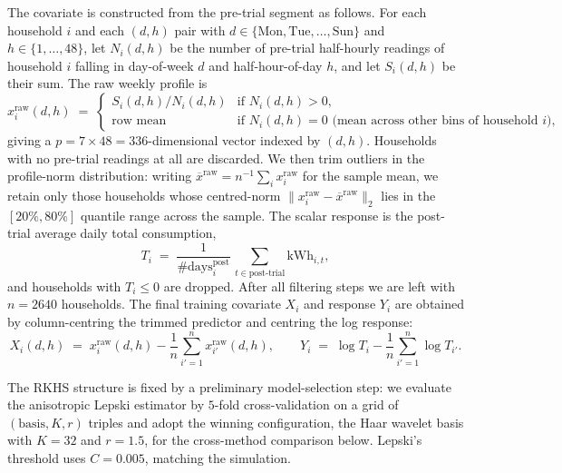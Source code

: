 \documentclass[aos]{imsart}
\renewcommand{\bar}{\overline}
\theoremstyle{plain}
\theoremstyle{definition}
\theoremstyle{definition}
\begin{document}
The covariate is constructed from the pre-trial segment as follows. For each household $i$ and each $(d, h)$ pair with $d \in \{\text{Mon},\text{Tue},\ldots,\text{Sun}\}$ and $h \in \{1,\ldots,48\}$, let $N_i(d,h)$ be the number of pre-trial half-hourly readings of household $i$ falling in day-of-week $d$ and half-hour-of-day $h$, and let $S_i(d,h)$ be their sum. The raw weekly profile is
\[
x_i^{\text{raw}}(d, h) \;=\; \begin{cases} S_i(d,h)/N_i(d,h) & \text{if } N_i(d,h) > 0,\\ \text{row mean} & \text{if } N_i(d,h)=0 \text{ (mean across other bins of household } i\text{)}, \end{cases}
\]
giving a $p = 7 \times 48 = 336$-dimensional vector indexed by $(d, h)$. Households with no pre-trial readings at all are discarded. We then trim outliers in the profile-norm distribution: writing $\bar x^{\text{raw}} = n^{-1}\sum_i x_i^{\text{raw}}$ for the sample mean, we retain only those households whose centred-norm $\|x_i^{\text{raw}} - \bar x^{\text{raw}}\|_2$ lies in the $[20\%, 80\%]$ quantile range across the sample. The scalar response is the post-trial average daily total consumption,
\[
T_i \;=\; \frac{1}{\#\text{days}_i^{\text{post}}}\,\sum_{t \in \text{post-trial}} \text{kWh}_{i,t},
\]
and households with $T_i \le 0$ are dropped. After all filtering steps we are left with $n = 2640$ households. The final training covariate $X_i$ and response $Y_i$ are obtained by column-centring the trimmed predictor and centring the log response:
\[
X_i(d, h) \;=\; x_i^{\text{raw}}(d, h) - \frac{1}{n}\sum_{i'=1}^{n} x_{i'}^{\text{raw}}(d, h),
\qquad
Y_i \;=\; \log T_i - \frac{1}{n}\sum_{i'=1}^n \log T_{i'}.
\]

The RKHS structure is fixed by a preliminary model-selection step: we evaluate the anisotropic Lepski estimator by $5$-fold cross-validation on a grid of $(\text{basis}, K, r)$ triples and adopt the winning configuration, the Haar wavelet basis with $K = 32$ and $r = 1.5$, for the cross-method comparison below. Lepski's threshold uses $C = 0.005$, matching the simulation.
\end{document}
